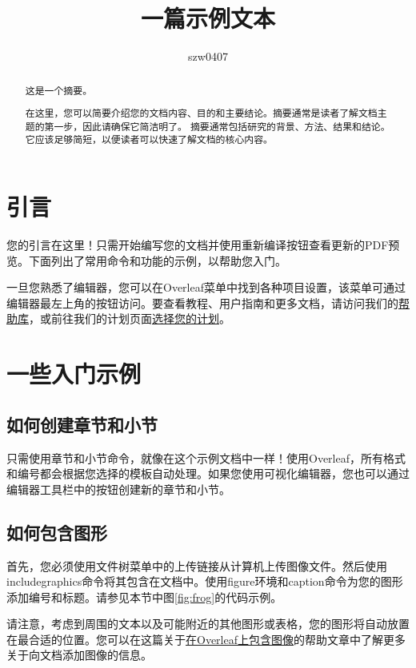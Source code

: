 \documentclass{article}
\title{一篇示例文本}
\author{szw0407}
\begin{document}
\maketitle

\begin{abstract}
      这是一个摘要。

      在这里，您可以简要介绍您的文档内容、目的和主要结论。摘要通常是读者了解文档主题的第一步，因此请确保它简洁明了。
      摘要通常包括研究的背景、方法、结果和结论。它应该足够简短，以便读者可以快速了解文档的核心内容。
\end{abstract}
\newpage
\tableofcontents
\newpage
\section{引言}

您的引言在这里！只需开始编写您的文档并使用重新编译按钮查看更新的PDF预览。下面列出了常用命令和功能的示例，以帮助您入门。

一旦您熟悉了编辑器，您可以在Overleaf菜单中找到各种项目设置，该菜单可通过编辑器最左上角的按钮访问。要查看教程、用户指南和更多文档，请访问我们的\href{https://www.overleaf.com/learn}{帮助库}，或前往我们的计划页面\href{https://www.overleaf.com/user/subscription/plans}{选择您的计划}。

\section{一些入门示例}

\subsection{如何创建章节和小节}

只需使用章节和小节命令，就像在这个示例文档中一样！使用Overleaf，所有格式和编号都会根据您选择的模板自动处理。如果您使用可视化编辑器，您也可以通过编辑器工具栏中的按钮创建新的章节和小节。

\subsection{如何包含图形}

首先，您必须使用文件树菜单中的上传链接从计算机上传图像文件。然后使用includegraphics命令将其包含在文档中。使用figure环境和caption命令为您的图形添加编号和标题。请参见本节中图\ref{fig:frog}的代码示例。

请注意，考虑到周围的文本以及可能附近的其他图形或表格，您的图形将自动放置在最合适的位置。您可以在这篇关于\href{https://www.overleaf.com/learn/how-to/Including_images_on_Overleaf}{在Overleaf上包含图像}的帮助文章中了解更多关于向文档添加图像的信息。
\end{document}
